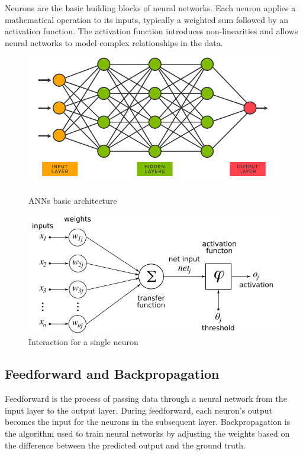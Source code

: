 Neurons are the basic building blocks of neural networks. Each neuron applies a mathematical operation to its inputs, typically a weighted sum followed by an activation function. The activation function introduces non-linearities and allows neural networks to model complex relationships in the data.
\begin{figure}[H]
    \begin{minipage}{0.5\textwidth}
        \centering
        \includegraphics[width=\textwidth]{Img/05_ANN.png}
        \caption{ANNs basic architecture \cite{ANN}}
        \label{fig:ANNs}
    \end{minipage}
    \begin{minipage}{0.5\textwidth}
        \centering
        \includegraphics[width=\textwidth]{Img/05_Neuron.png}
        \caption{Interaction for a single neuron \cite{neuron}}
        \label{fig:Neuron}
    \end{minipage}
\end{figure}

\subsection{Feedforward and Backpropagation}
Feedforward is the process of passing data through a neural network from the input layer to the output layer. During feedforward, each neuron's output becomes the input for the neurons in the subsequent layer. Backpropagation is the algorithm used to train neural networks by adjusting the weights based on the difference between the predicted output and the ground truth.


